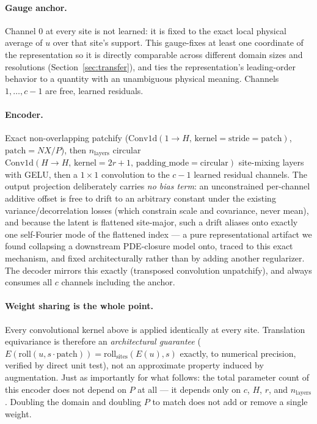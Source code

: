 \documentclass[11pt]{article}
\begin{document}
\paragraph{Gauge anchor.} Channel $0$ at every site is not learned: it
is fixed to the exact local physical average of $u$ over that site's
support. This gauge-fixes at least one coordinate of the representation
so it is directly comparable across different domain sizes and
resolutions (Section~\ref{sec:transfer}), and ties the representation's
leading-order behavior to a quantity with an unambiguous physical
meaning. Channels $1,\dots,c-1$ are free, learned residuals.

\paragraph{Encoder.} Exact non-overlapping patchify
($\mathrm{Conv1d}(1{\to}H,\,\mathrm{kernel}=\mathrm{stride}=\mathrm{patch})$,
$\mathrm{patch}=NX/P$), then $n_{\mathrm{layers}}$ circular
$\mathrm{Conv1d}(H{\to}H,\,\mathrm{kernel}=2r{+}1,\,
\mathrm{padding\_mode}{=}\mathrm{circular})$ site-mixing layers with GELU,
then a $1{\times}1$ convolution to the $c{-}1$ learned residual channels.
The output projection deliberately carries \emph{no bias term}: an
unconstrained per-channel additive offset is free to drift to an
arbitrary constant under the existing variance/decorrelation losses
(which constrain scale and covariance, never mean), and because the
latent is flattened site-major, such a drift aliases onto exactly one
self-Fourier mode of the flattened index --- a pure representational
artifact we found collapsing a downstream PDE-closure model onto,
traced to this exact mechanism, and fixed architecturally rather than
by adding another regularizer. The decoder mirrors this exactly
(transposed convolution unpatchify), and always consumes all $c$
channels including the anchor.

\paragraph{Weight sharing is the whole point.} Every convolutional
kernel above is applied identically at every site. Translation
equivariance is therefore an \emph{architectural guarantee}
($E(\mathrm{roll}(u, s\cdot\mathrm{patch})) = \mathrm{roll}_{\mathrm{sites}}(E(u), s)$
exactly, to numerical precision, verified by direct unit test), not an
approximate property induced by augmentation. Just as importantly for
what follows: the total parameter count of this encoder does not depend
on $P$ at all --- it depends only on $c$, $H$, $r$, and
$n_{\mathrm{layers}}$. Doubling the domain and doubling $P$ to match
does not add or remove a single weight.
\end{document}
